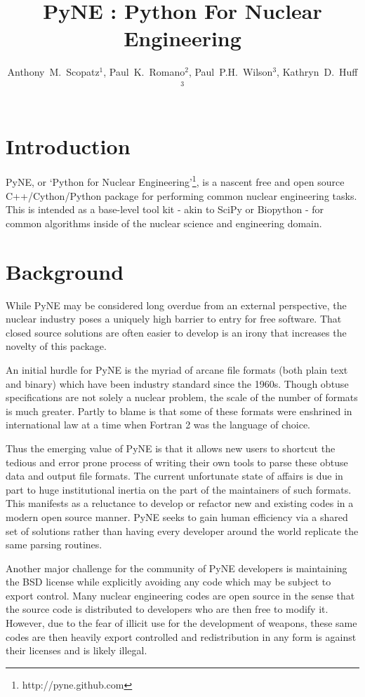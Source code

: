 \documentclass{anstrans}
\title{PyNE : Python For Nuclear Engineering}
\author{Anthony~M.~Scopatz$^1$, Paul~K.~Romano$^2$, Paul~P.H.~Wilson$^3$, Kathryn~D.~Huff$^3$}
\institute{$^1$ University of Chicago, $^2$ Massachusetts Institute of Technology, $^3$ University of Wisconsin }
\date{}
\begin{document}
\section{Introduction}

PyNE, or `Python for Nuclear Engineering'\footnote{http://pyne.github.com}, is a
nascent free and open source C++/Cython/Python package for performing common
nuclear engineering tasks.  This is intended as a base-level tool kit - akin to
SciPy or Biopython - for common algorithms inside of the nuclear science and
engineering domain.

\section{Background}

While PyNE may be considered long overdue from an external perspective, the 
nuclear industry poses a uniquely high barrier to entry for free software.  
That closed source solutions are often easier to develop is an irony that 
increases the novelty of this package.

An initial hurdle for PyNE is the myriad of arcane file formats (both plain text
and binary) which have been industry standard since the 1960s.  Though obtuse 
specifications are not solely a nuclear problem, the scale of the number of formats 
is much greater.  Partly to blame is that some of these formats were enshrined 
in international law at a time when Fortran 2 was the language of choice.

Thus the emerging value of PyNE is that it allows new users to shortcut the tedious and 
error prone process of writing their own tools to parse these obtuse data and output file 
formats.  The current unfortunate state of affairs is due in part to huge institutional 
inertia on the part of the maintainers of such formats.  This manifests as a reluctance to 
develop or refactor new and existing codes in a modern open source manner.  PyNE seeks to 
gain human efficiency via a shared set of solutions rather than having every developer 
around the world replicate the same parsing routines.

Another major challenge for the community of PyNE developers is maintaining
the BSD license while explicitly avoiding any code which may be subject to 
export control.  Many nuclear engineering codes are open source in the sense
that the source code is distributed to developers who are then free to modify it.
However, due to the fear of illicit use for the development of weapons, these
same codes are then heavily export controlled and redistribution in any form is 
against their licenses and is likely illegal.
\end{document}
